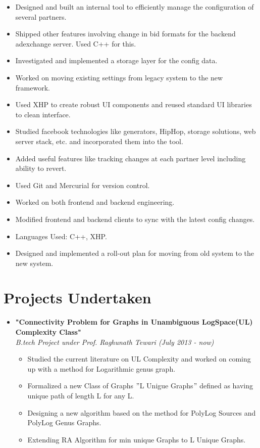 \documentclass[margin,line]{resume}
\begin{document}
\begin{resume}
\begin{itemize}
\begin{itemize}
\begin{itemize}
      \item Designed and built an internal tool to efficiently manage the configuration of several partners.
      \item Shipped other features involving change in bid formats for the backend adexchange server. Used C++ for this.
      \item Investigated and implemented a storage layer for the config data.
      \item Worked on moving existing settings from legacy system to the new framework.
      \item Used XHP to create robust UI components and reused standard UI libraries to clean interface.
      \item Studied facebook technologies like generators, HipHop, storage solutions, web server stack, etc. and incorporated them into the tool.
      \item Added useful features like tracking changes at each partner level including ability to revert.
      \item Used Git and Mercurial for version control.
      \item Worked on both frontend and backend engineering.
      \item Modified frontend and backend clients to sync with the latest config changes.
      \item Languages Used: C++, XHP.
      \item Designed and implemented a roll-out plan for moving from old system to the new system.
      \end{itemize}
    \end{itemize}
  \end{itemize}

  \section{\mysidestyle Projects Undertaken}

  \begin{itemize}
  \item \large{\textbf{\textsf{"Connectivity Problem for Graphs in Unambiguous LogSpace(UL) Complexity Class"}}}
    \\ \small{\textit{B.tech Project under Prof. Raghunath Tewari (July 2013 - now)}}
    \normalsize
    \begin{itemize}
    \item Studied the current literature on UL Complexity and worked on coming up with a method for Logarithmic genus graph.
    \item Formalized a new Class of Graphs $"$L Unigue Graphs$"$ defined as having unique path of length L for any L.
    \item Designing a new algorithm based on the method for PolyLog Sources and PolyLog Genus Graphs.
    \item Extending RA Algorithm for min unique Graphs to L Unique Graphs.
    \end{itemize}


\end{itemize}
\end{resume}
\end{document}
